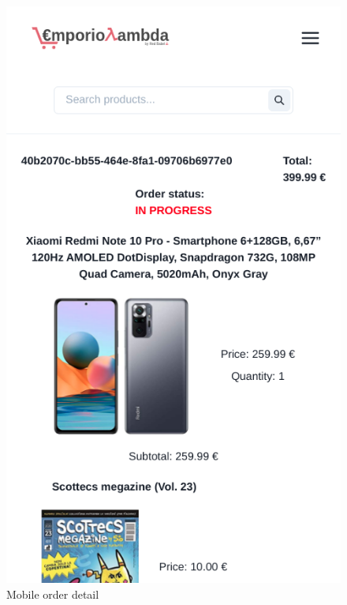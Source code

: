\begin{itemize}
\begin{figure}[!ht]
              \caption{Mobile order detail}
              \vspace{10px}
              \includegraphics[scale=0.2]{../../../../Images/userManual/oderMobileDetail.png}
              \centering
          \end{figure}

\end{itemize}
